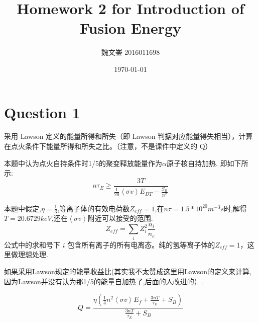 \documentclass[UTF8, 10pt]{article}
\title{Homework 2 for Introduction of Fusion Energy}
\author{魏文崟 2016011698}
\date{\today}
\begin{document}
        \maketitle
        \thispagestyle{fancy}

    \setlength{\oddsidemargin}{ 1cm}  %
    \setlength{\evensidemargin}{\oddsidemargin}
    \setlength{\textwidth}{13.50cm}
    \vspace{-.8cm}
    \begin{center}
	\end{center}





    \setlength{\oddsidemargin}{-.5cm}  %
    \setlength{\evensidemargin}{\oddsidemargin}
    \setlength{\textwidth}{17.00cm}




\section*{Question 1}
采用 Lawson 定义的能量所得和所失（即 Lawson 判据对应能量得失相当），计算在点火条件下能量所得和所失之比。（注意，不是课件中定义的 Q）

本题中认为点火自持条件时1/5的聚变释放能量作为$\alpha$原子核自持加热.
即如下所示:
\begin{equation}
    n\tau_E\geq\frac{3T}{\frac{1}{20}\left \langle \sigma v \right \rangle E_{DT}-\frac{S_B}{n^2}}
\end{equation}

本题中假定,$\eta=\frac{1}{3}$,等离子体的有效电荷数$Z_{eff}=1$,在$n\tau=1.5*10^20m^{-3}s$时,解得$T=20.6729keV$,还在$\left \langle \sigma v \right \rangle$附近可以接受的范围.
\begin{equation*}
    Z_{eff}=\sum\limits_i Z_i^2\frac{n_i}{n_e}
\end{equation*}
公式中的求和号下 $i$ 包含所有离子的所有电离态。纯的氢等离子体的$Z_{eff}=1$，这里做理想处理.

如果采用Lawson规定的能量收益比(其实我不太赞成这里用Lawson的定义来计算,因为Lawson并没有认为那1/5的能量自加热了,后面的人改进的）.

\begin{equation}
    Q=\frac{\eta(\frac{1}{4}n^2\left \langle \sigma v \right \rangle E_f+\frac{3nT}{\tau_E}+S_B)}{\frac{3nT}{\tau_E}+S_B}
\end{equation}
\end{document}
